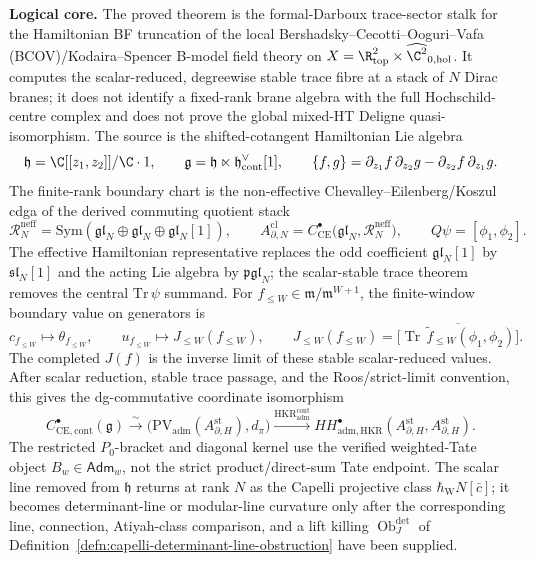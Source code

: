 \documentclass[11pt]{memoir}
\begin{document}
  \noindent\textbf{Logical core.}
  The proved theorem is the formal-Darboux trace-sector stalk for the
  Hamiltonian BF truncation of the local
  Bershadsky--Cecotti--Ooguri--Vafa (BCOV)/Kodaira--Spencer B-model
  field theory on
  \(X=\R^2_{\mathrm{top}}\times\widehat{\C^2}_{0,\mathrm{hol}}\).
  It computes the scalar-reduced, degreewise stable trace fibre at a
  stack of \(N\) Dirac branes; it does not identify a fixed-rank brane
  algebra with the full Hochschild-centre complex and does not prove the
  global mixed-HT Deligne quasi-isomorphism.  The source is the
  shifted-cotangent Hamiltonian Lie algebra
  \[
    \mathfrak h=\C[[z_1,z_2]]/\C\cdot1,
    \qquad
    \mathfrak g=\mathfrak h\ltimes
      \mathfrak h^\vee_{\mathrm{cont}}[1],
    \qquad
    \{f,g\}=\partial_{z_1}f\,\partial_{z_2}g
      -\partial_{z_2}f\,\partial_{z_1}g .
  \]
  The finite-rank boundary chart is the non-effective
  Chevalley--Eilenberg/Koszul cdga of the derived commuting quotient stack
  \[
    \mathcal R_N^{\mathrm{neff}}=
      \mathrm{Sym}(\mathfrak{gl}_N\oplus\mathfrak{gl}_N
      \oplus\mathfrak{gl}_N[1]),
    \qquad
    A^{\mathrm{cl}}_{\partial,N}=
    C^\bullet_{\mathrm{CE}}\bigl(\mathfrak{gl}_N,
      \mathcal R_N^{\mathrm{neff}}\bigr),
    \qquad Q\psi=[\phi_1,\phi_2].
  \]
  The effective Hamiltonian representative replaces the odd coefficient
  \(\mathfrak{gl}_N[1]\) by \(\mathfrak{sl}_N[1]\) and the acting Lie
  algebra by \(\mathfrak{pgl}_N\); the scalar-stable trace theorem removes
  the central \(\mathrm{Tr}\,\psi\) summand.
  For \(f_{\leq W}\in\mathfrak m/\mathfrak m^{W+1}\), the
  finite-window boundary value on generators is
  \[
    c_{f_{\leq W}}\mapsto\theta_{f_{\leq W}},
    \qquad
    u_{f_{\leq W}}\mapsto J_{\leq W}(f_{\leq W}),
    \qquad
    J_{\leq W}(f_{\leq W})
    =
    \bigl[
      \overline{\operatorname{Tr}\,
      \tilde f_{\leq W}(\phi_1,\phi_2)}
    \bigr] .
  \]
  The completed \(J(f)\) is the inverse limit of these stable
  scalar-reduced values.
  After scalar reduction, stable trace passage, and the Roos/strict-limit
  convention, this gives the dg-commutative coordinate isomorphism
  \[
    C^\bullet_{\mathrm{CE},\mathrm{cont}}(\mathfrak g)
    \xrightarrow{\ \sim\ }
    \bigl(\mathrm{PV}_{\mathrm{adm}}
      (A_{\partial,H}^{\mathrm{st}}),d_\pi\bigr)
    \xrightarrow{\mathrm{HKR}^{\mathrm{cont}}_{\mathrm{adm}}}
    HH^\bullet_{\mathrm{adm},\mathrm{HKR}}
      (A_{\partial,H}^{\mathrm{st}},A_{\partial,H}^{\mathrm{st}}).
  \]
  The restricted \(P_0\)-bracket and diagonal kernel use the verified
  weighted-Tate object \(B_w\in\mathsf{Adm}_w\), not the strict
  product/direct-sum Tate endpoint.  The scalar line removed from
  \(\mathfrak h\) returns at rank \(N\) as the Capelli projective class
  \(\hbar_{\mathrm{W}}N[\bar c]\); it becomes determinant-line or
  modular-line curvature only after the corresponding line, connection,
  Atiyah-class comparison, and a lift killing
  \(\operatorname{Ob}^{\det}_J\) of
  Definition~\ref{defn:capelli-determinant-line-obstruction} have been
  supplied.
\end{document}
